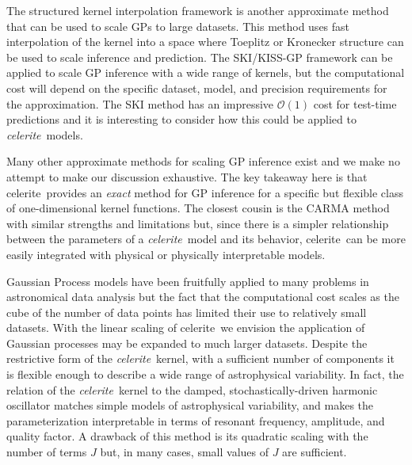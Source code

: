 \documentclass[manuscript, letterpaper]{aastex6}
\makeatletter
\let\origsection\section
\renewcommand\section{\@ifstar{\starsection}{\nostarsection}}
\newcommand\nostarsection[1]{\sectionprelude\origsection{#1}}
\newcommand\starsection[1]{\sectionprelude\origsection*{#1}}
\newcommand\sectionprelude{\vspace{1em}}
\newcommand{\project}[1]{\textsf{#1}}
\newcommand{\celerite}{\project{celerite}}
\newcommand{\celeriteterm}{\emph{celerite}}
\makeatother
\begin{document}
The structured kernel interpolation \citep[SKI/KISS-GP][]{Wilson:2015}
framework is another approximate method that can be used to scale GPs to large
datasets.
This method uses fast interpolation of the kernel into a space where Toeplitz
or Kronecker structure can be used to scale inference and prediction.
The SKI/KISS-GP framework can be applied to scale GP inference with a wide
range of kernels, but the computational cost will depend on the specific
dataset, model, and precision requirements for the approximation.
The SKI method has an impressive $\mathcal{O}(1)$ cost for test-time
predictions and it is interesting to consider how this could be applied to
\celeriteterm\ models.

Many other approximate methods for scaling GP inference exist \citep[see, for
example,][and references therein]{Wilson:2015a} and we make no attempt to make
our discussion exhaustive.
The key takeaway here is that \celerite\ provides an \emph{exact} method for
GP inference for a specific but flexible class of one-dimensional kernel
functions.
The closest cousin is the CARMA method with similar strengths and limitations
but, since there is a simpler relationship between the parameters of a
\celeriteterm\ model and its behavior, \celerite\ can be more easily integrated
with physical or physically interpretable models.

\section{Summary}

Gaussian Process models have been fruitfully applied to many problems in
astronomical data analysis but the fact that the computational cost scales as
the cube of the number of data points has limited their use to relatively
small datasets.
With the linear scaling of \celerite\, we envision the application of Gaussian
processes may be expanded to much larger datasets.
Despite the restrictive form of the \celeriteterm\ kernel, with a sufficient
number of components it is flexible enough to describe a wide range of
astrophysical variability.
In fact, the relation of the \celeriteterm\ kernel to the damped, stochastically-driven harmonic
oscillator matches simple models of astrophysical variability, and makes the
parameterization interpretable in terms of resonant frequency, amplitude, and
quality factor.
A drawback of this method is its quadratic scaling with the number of
terms $J$ but, in many cases, small values of $J$ are sufficient.
\end{document}
